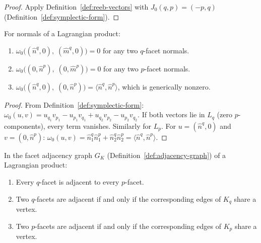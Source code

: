 \begin{proof}
Apply Definition~\ref{def:reeb-vectors} with
$J_0(q, p) = (-p, q)$
(Definition~\ref{def:symplectic-form}).
\end{proof}

\begin{lemma}\label{lem:omega-vanishes}
For normals of a Lagrangian product:
\begin{enumerate}
\item $\omega_0\bigl((\hat{n}^q, 0),\; (\hat{m}^q, 0)\bigr) = 0$
  for any two $q$-facet normals.
\item $\omega_0\bigl((0, \hat{n}^p),\; (0, \hat{m}^p)\bigr) = 0$
  for any two $p$-facet normals.
\item $\omega_0\bigl((\hat{n}^q, 0),\; (0, \hat{n}^p)\bigr)
  = \langle \hat{n}^q, \hat{n}^p \rangle$,
  which is generically nonzero.
\end{enumerate}
\end{lemma}

\begin{proof}
From Definition~\ref{def:symplectic-form}:
$\omega_0(u, v) = u_{q_1} v_{p_1} - u_{p_1} v_{q_1} + u_{q_2} v_{p_2} - u_{p_2} v_{q_2}$.
If both vectors lie in $L_q$ (zero $p$-components), every term vanishes.
Similarly for $L_p$.
For $u = (\hat{n}^q, 0)$ and $v = (0, \hat{n}^p)$:
$\omega_0(u, v) = \hat{n}^q_1 \hat{n}^p_1 + \hat{n}^q_2 \hat{n}^p_2
= \langle \hat{n}^q, \hat{n}^p \rangle$.
\end{proof}


\begin{lemma}\label{lem:lagrangian-adjacency}
In the facet adjacency graph $G_K$
(Definition~\ref{def:adjacency-graph}) of a Lagrangian product:
\begin{enumerate}
\item Every $q$-facet is adjacent to every $p$-facet.
\item Two $q$-facets are adjacent if and only if
  the corresponding edges of $K_q$ share a vertex.
\item Two $p$-facets are adjacent if and only if
  the corresponding edges of $K_p$ share a vertex.
\end{enumerate}
\end{lemma}

